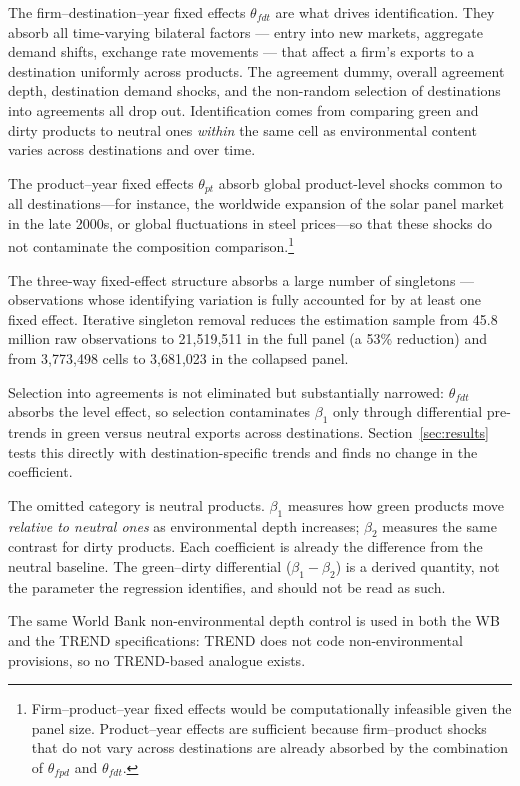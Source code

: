 \documentclass[12pt]{article}
\begin{document}
The firm--destination--year fixed effects $\theta_{fdt}$ are what drives
identification. They absorb all time-varying bilateral factors --- entry into new markets, aggregate demand shifts, exchange rate movements --- that affect a firm's exports to a destination uniformly across products. The agreement dummy, overall agreement depth, destination demand shocks, and the non-random selection of destinations into agreements all drop out. Identification comes from comparing green and dirty products to neutral ones \emph{within} the same cell as environmental content varies across destinations and over time.

The product--year fixed effects $\theta_{pt}$ absorb global product-level shocks
common to all destinations---for instance, the worldwide expansion of the solar
panel market in the late 2000s, or global fluctuations in steel prices---so that
these shocks do not contaminate the composition comparison.\footnote{Firm--product--year fixed effects would be computationally infeasible given the panel size. Product--year effects are sufficient because firm--product shocks that do not vary across destinations are already absorbed by the combination of $\theta_{fpd}$ and $\theta_{fdt}$.}

The three-way fixed-effect structure absorbs a large number of singletons
--- observations whose identifying variation is fully accounted for by at
least one fixed effect.  Iterative singleton removal
\citep{correia2017} reduces the estimation sample from 45.8 million
raw observations to 21,519,511 in the full panel (a 53\% reduction)
and from 3,773,498 cells to 3,681,023 in the collapsed panel.

Selection into agreements is not eliminated but substantially narrowed: $\theta_{fdt}$ absorbs the level effect, so selection contaminates $\beta_1$ only through differential pre-trends in green versus neutral exports across destinations. Section~\ref{sec:results} tests this directly with destination-specific trends and finds no change in the coefficient.

The omitted category is neutral products. $\beta_1$ measures how green products
move \emph{relative to neutral ones} as environmental depth increases; $\beta_2$
measures the same contrast for dirty products. Each coefficient is already the
difference from the neutral baseline. The green--dirty differential
($\beta_1 - \beta_2$) is a derived quantity, not the parameter the regression
identifies, and should not be read as such.

The same World Bank non-environmental depth control is used in both the WB and the TREND specifications: TREND does not code non-environmental provisions, so no TREND-based analogue exists.
\end{document}
